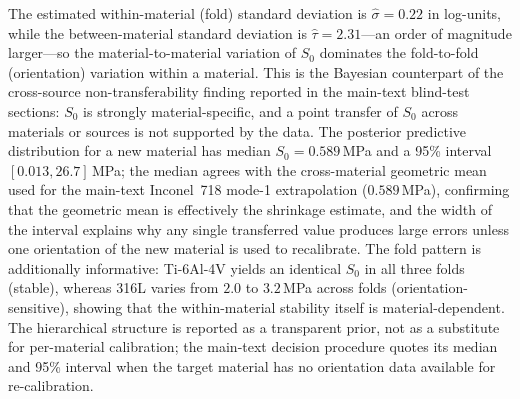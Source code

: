 \documentclass[12pt,a4paper,twocolumn]{article}
\begin{document}
The estimated within-material (fold) standard deviation is $\hat\sigma = 0.22$ in log-units, while the between-material standard deviation is $\hat\tau = 2.31$---an order of magnitude larger---so the material-to-material variation of $S_0$ dominates the fold-to-fold (orientation) variation within a material. This is the Bayesian counterpart of the cross-source non-transferability finding reported in the main-text blind-test sections: $S_0$ is strongly material-specific, and a point transfer of $S_0$ across materials or sources is not supported by the data. The posterior predictive distribution for a new material has median $S_0 = 0.589$\,MPa and a 95\% interval $[0.013, 26.7]$\,MPa; the median agrees with the cross-material geometric mean used for the main-text Inconel~718 mode-1 extrapolation ($0.589$\,MPa), confirming that the geometric mean is effectively the shrinkage estimate, and the width of the interval explains why any single transferred value produces large errors unless one orientation of the new material is used to recalibrate. The fold pattern is additionally informative: Ti-6Al-4V yields an identical $S_0$ in all three folds (stable), whereas 316L varies from $2.0$ to $3.2$\,MPa across folds (orientation-sensitive), showing that the within-material stability itself is material-dependent. The hierarchical structure is reported as a transparent prior, not as a substitute for per-material calibration; the main-text decision procedure quotes its median and 95\% interval when the target material has no orientation data available for re-calibration.
\end{document}
